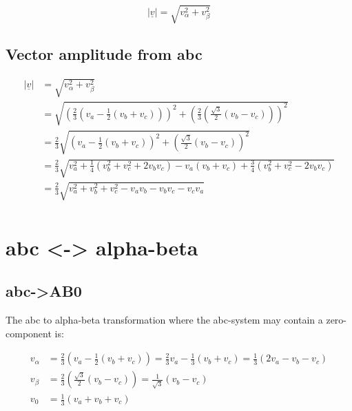 \documentclass[]{book}
\begin{document}
\[
|\underline{v}| = \sqrt{v_\alpha^2 +  v_\beta^2}
\label{eq:amplAB}
\]

\hypertarget{vector-amplitude-from-abc}{%
\subsection{Vector amplitude from abc}\label{vector-amplitude-from-abc}}

\[
\begin{aligned}
|\underline{v}| &= \sqrt{v_\alpha^2 +  v_\beta^2}  \\
& =  \sqrt{\left(\frac{2}{3}( v_a - \frac{1}{2}  (v_b+v_c)) \right)^2 + \left(\frac{2}{3} (\frac{\sqrt{3}}{2} (v_b-v_c) )\right)^2 }  \\
& = \frac{2}{3} \sqrt{\left( v_a - \frac{1}{2}  (v_b+v_c) \right)^2 + \left( \frac{\sqrt{3}}{2} (v_b-v_c) \right)^2 }  \\
& = \frac{2}{3} \sqrt{ v_a^2 + \frac{1}{4}(v_b^2+v_c^2+2v_b v_c)-v_a(v_b+v_c)  + \frac{3}{4} (v_b^2+v_c^2-2v_bv_c)  } \\
& = \frac{2}{3} \sqrt{ v_a^2 + v_b^2 + v_c^2 -v_a v_b -v_b v_c  -v_c v_a } \\
\end{aligned}
\label{eq:amplAbc}
\]

\hypertarget{abc---alpha-beta}{%
\section{abc \textless{}-\textgreater{} alpha-beta}\label{abc---alpha-beta}}

\hypertarget{abc-ab0}{%
\subsection{abc-\textgreater{}AB0}\label{abc-ab0}}

The abc to alpha-beta transformation where the abc-system may contain a zero-component is:

\[
\begin{aligned}
v_\alpha &= \frac{2}{3} \left( v_a - \frac{1}{2}  (v_b+v_c) \right) = \frac{2}{3}  v_a - \frac{1}{3}  (v_b+v_c) = \frac{1}{3} ( 2 v_a - v_b-v_c)  \\
v_\beta &= \frac{2}{3} \left( \frac{\sqrt{3}}{2} (v_b-v_c) \right)=  \frac{1}{\sqrt{3}} (v_b-v_c) \\
v_0 &= \frac{1}{3} \left( v_a+v_b+v_c \right) \\
\end{aligned}
\label{eq:abcABZ1}
\]
\end{document}
